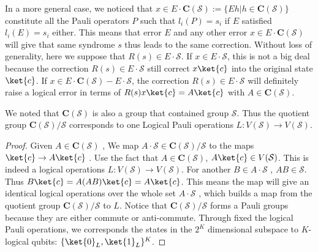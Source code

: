\documentclass[11pt]{article}
\begin{document}
In a more general case, we noticed that $x \in E \cdot \mathbf{C}(\mathcal{S}) := \{E h | h \in \mathbf{C}(\mathcal{S})\}$ constitute all the Pauli operators $P$ such that $l_i(P) = s_i$ if $E$ satisfied $l_i(E) = s_i$ either. 
This means that error $E$ and any other error $x  \in E \cdot \mathbf{C}(\mathcal{S})$ will give that same syndrome $s$ thus leads to the same correction. Without loss of generality, here we suppose that $R(s) \in E \cdot \mathcal{S}$.  
If $x \in E \cdot \mathcal{S}$, this is not a big deal because the correction $R(s) \in E \cdot \mathcal{S}$ still correct $x\ket{c}$ into the original state $\ket{c}$.
If $x \in E \cdot \mathbf{C}(\mathcal{S})-E \cdot \mathcal{S}$, the correction $R(s) \in E \cdot \mathcal{S}$ will definitely raise a logical error in terms of $R(s) x\ket{c} = A\ket{c}$ with $A \in \mathbf{C}(\mathcal{S})$. 

\begin{lemma}
    We noted that  $\mathbf{C}(\mathcal{S})$ is also a group that contained group $\mathcal{S}$. Thus the quotient group $ \mathbf{C}(\mathcal{S})/\mathcal{S}$ corresponds to one Logical Pauli operations $L:V(\mathcal{S}) \to V(\mathcal{S})$.
\end{lemma}

\begin{proof}
    Given $A \in \mathbf{C}(\mathcal{S})$ , We map $A \cdot \mathcal{S} \in \mathbf{C}(\mathcal{S})/\mathcal{S} $ to the maps $\ket{c} \to A\ket{c}$ . Use the fact that  $A \in \mathbf{C}(\mathcal{S})$, $A\ket{c} \in V(\mathcal{S})$. This is indeed a logical operations $L:V(\mathcal{S}) \to V(\mathcal{S})$. For another $B \in A \cdot \mathcal{S}$ , $AB \in \mathcal{S}$. Thus $B\ket{c} = A(AB)\ket{c} = A\ket{c}$. This means the map will give an identical logical operations over the whole set $A \cdot \mathcal{S}$ , which builds a map from the quotient group $ \mathbf{C}(\mathcal{S})/\mathcal{S}$  to $L$. 
    Notice that  $ \mathbf{C}(\mathcal{S})/\mathcal{S}$ forms a Pauli groups because they are either commute or anti-commute. Through fixed the logical Pauli operations, we corresponds the states in the  $2^K$ dimensional subspace to $K$-logical qubits: $\{\ket{0}_L, \ket{1}_L\}^{K}$.
\end{proof}
\end{document}
